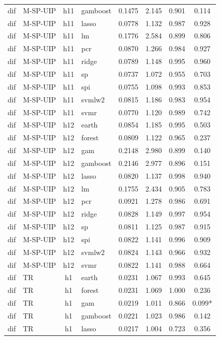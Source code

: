 \begin{ThreePartTable}
\begin{longtable}[t]{llclcccc}
dif & M-SP-UIP & h11 & gamboost & 0.1475 & 2.145 & 0.901 & 0.114\\
dif & M-SP-UIP & h11 & lasso & 0.0778 & 1.132 & 0.987 & 0.928\\
dif & M-SP-UIP & h11 & lm & 0.1776 & 2.584 & 0.899 & 0.806\\
dif & M-SP-UIP & h11 & pcr & 0.0870 & 1.266 & 0.984 & 0.927\\
dif & M-SP-UIP & h11 & ridge & 0.0789 & 1.148 & 0.995 & 0.960\\
dif & M-SP-UIP & h11 & sp & 0.0737 & 1.072 & 0.955 & 0.703\\
dif & M-SP-UIP & h11 & spi & 0.0755 & 1.098 & 0.993 & 0.853\\
dif & M-SP-UIP & h11 & svmlw2 & 0.0815 & 1.186 & 0.983 & 0.954\\
dif & M-SP-UIP & h11 & svmr & 0.0770 & 1.120 & 0.989 & 0.742\\
\addlinespace
dif & M-SP-UIP & h12 & earth & 0.0854 & 1.185 & 0.995 & 0.503\\
dif & M-SP-UIP & h12 & forest & 0.0809 & 1.122 & 0.965 & 0.237\\
dif & M-SP-UIP & h12 & gam & 0.2148 & 2.980 & 0.899 & 0.140\\
dif & M-SP-UIP & h12 & gamboost & 0.2146 & 2.977 & 0.896 & 0.151\\
dif & M-SP-UIP & h12 & lasso & 0.0820 & 1.137 & 0.998 & 0.940\\
dif & M-SP-UIP & h12 & lm & 0.1755 & 2.434 & 0.905 & 0.783\\
dif & M-SP-UIP & h12 & pcr & 0.0921 & 1.278 & 0.986 & 0.691\\
dif & M-SP-UIP & h12 & ridge & 0.0828 & 1.149 & 0.997 & 0.954\\
dif & M-SP-UIP & h12 & sp & 0.0811 & 1.125 & 0.987 & 0.915\\
dif & M-SP-UIP & h12 & spi & 0.0822 & 1.141 & 0.996 & 0.909\\
dif & M-SP-UIP & h12 & svmlw2 & 0.0824 & 1.143 & 0.966 & 0.932\\
dif & M-SP-UIP & h12 & svmr & 0.0822 & 1.141 & 0.988 & 0.664\\
\addlinespace
dif & TR & h1 & earth & 0.0231 & 1.067 & 0.993 & 0.645\\
dif & TR & h1 & forest & 0.0231 & 1.069 & 1.000 & 0.236\\
dif & TR & h1 & gam & 0.0219 & 1.011 & 0.866 & 0.099*\\
dif & TR & h1 & gamboost & 0.0221 & 1.023 & 0.986 & 0.142\\
dif & TR & h1 & lasso & 0.0217 & 1.004 & 0.723 & 0.356\\

\end{longtable}
\end{ThreePartTable}
